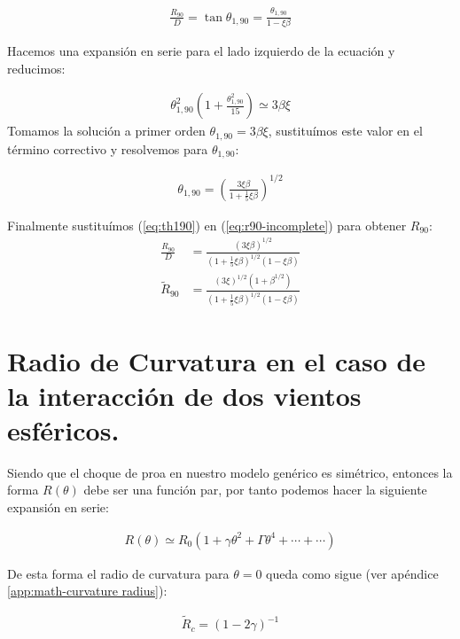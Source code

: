 \begin{align}
  \frac{R_{90}}{D} = \tan\theta_{1,90} = \frac{\theta_{1,90}}{1-\xi\beta} \label{eq:r90-incomplete}
\end{align}

Hacemos una expansión en serie para el lado izquierdo de la ecuación y reducimos:

\begin{align}
  \theta^2_{1,90}\left(1 + \frac{\theta^2_{1,90}}{15}\right) \simeq 3\beta\xi
\end{align}
Tomamos la solución a primer orden $\theta_{1,90} = 3\beta\xi$,  sustituímos este valor en el término correctivo y resolvemos para
$\theta_{1,90}$:

\begin{align}
  \theta_{1,90} = \left(\frac{3\xi\beta}{1+\frac{1}{5}\xi\beta}\right)^{1/2} \label{eq:th190}
\end{align}

Finalmente sustituímos (\ref{eq:th190}) en (\ref{eq:r90-incomplete}) para obtener $R_{90}$:
\begin{align}
  \frac{R_{90}}{D} &= \frac{\left(3\xi\beta\right)^{1/2}}{\left(1+\frac{1}{5}\xi\beta\right)^{1/2}\left(1-\xi\beta\right)} \\
  \tilde{R}_{90} &= \frac{\left(3\xi\right)^{1/2}\left(1+\beta^{1/2}\right)}
                   {\left(1+\frac{1}{5}\xi\beta\right)^{1/2}\left(1-\xi\beta\right)} 
\end{align}

\section{Radio de Curvatura en el  caso de la interacción de dos vientos esféricos.}

Siendo que el choque de proa en nuestro modelo genérico es simétrico, entonces la forma $R(\theta)$ debe ser una función par,
por tanto podemos hacer la siguiente expansión en serie:

\begin{align}
  R(\theta) \simeq R_0\left(1 + \gamma\theta^2 + \Gamma\theta^4 +\cdots +\cdots \right)
\end{align}

De esta forma el radio de curvatura para $\theta=0$ queda como sigue (ver apéndice \ref{app:math-curvature radius}):

\begin{align}
  \tilde{R}_c = \left(1 - 2\gamma\right)^{-1}
\end{align}

